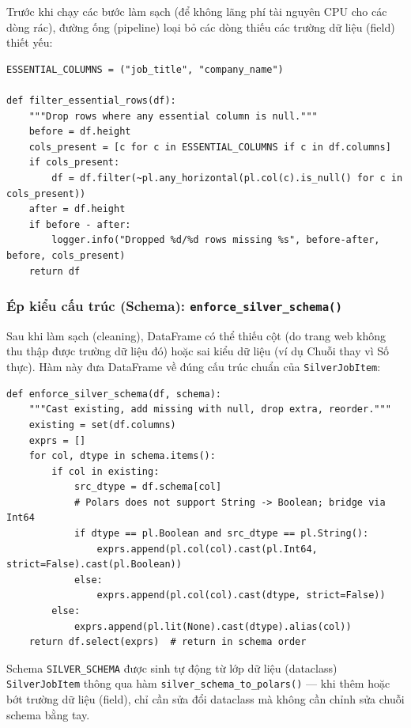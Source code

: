 Trước khi chạy các bước làm sạch (để không lãng phí tài nguyên CPU cho các dòng rác),
đường ống (pipeline) loại bỏ các dòng thiếu các trường dữ liệu (field) thiết yếu:

\begin{lstlisting}[style=pystyle, caption={Lọc dòng thiếu field thiết yếu}, label={lst:filter-essential}]
ESSENTIAL_COLUMNS = ("job_title", "company_name")

def filter_essential_rows(df):
    """Drop rows where any essential column is null."""
    before = df.height
    cols_present = [c for c in ESSENTIAL_COLUMNS if c in df.columns]
    if cols_present:
        df = df.filter(~pl.any_horizontal(pl.col(c).is_null() for c in cols_present))
    after = df.height
    if before - after:
        logger.info("Dropped %d/%d rows missing %s", before-after, before, cols_present)
    return df
\end{lstlisting}

\subsubsection{Ép kiểu cấu trúc (Schema): \texttt{enforce\_silver\_schema()}}

Sau khi làm sạch (cleaning), DataFrame có thể thiếu cột (do trang web không thu thập được trường dữ liệu đó)
hoặc sai kiểu dữ liệu (ví dụ Chuỗi thay vì Số thực). Hàm này đưa DataFrame về đúng
cấu trúc chuẩn của \texttt{SilverJobItem}:

\begin{lstlisting}[style=pystyle, caption={Chuyển đổi DataFrame về cấu trúc chuẩn SilverJobItem}, label={lst:enforce-schema}]
def enforce_silver_schema(df, schema):
    """Cast existing, add missing with null, drop extra, reorder."""
    existing = set(df.columns)
    exprs = []
    for col, dtype in schema.items():
        if col in existing:
            src_dtype = df.schema[col]
            # Polars does not support String -> Boolean; bridge via Int64
            if dtype == pl.Boolean and src_dtype == pl.String():
                exprs.append(pl.col(col).cast(pl.Int64, strict=False).cast(pl.Boolean))
            else:
                exprs.append(pl.col(col).cast(dtype, strict=False))
        else:
            exprs.append(pl.lit(None).cast(dtype).alias(col))
    return df.select(exprs)  # return in schema order
\end{lstlisting}

Schema \texttt{SILVER\_SCHEMA} được sinh tự động từ lớp dữ liệu (dataclass)
\texttt{SilverJobItem} thông qua hàm \texttt{silver\_schema\_to\_polars()} —
khi thêm hoặc bớt trường dữ liệu (field), chỉ cần sửa đổi dataclass mà không cần chỉnh sửa chuỗi schema bằng tay.

